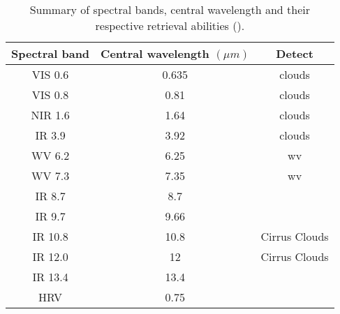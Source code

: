 \begin{table}[]
    \centering
    \setlength\extrarowheight{-7pt}
    \begin{tabular}{c|c|c}
        Spectral band & Central wavelength $\left( \mu m  \right)$ & Detect \\ \hline
        VIS 0.6 & 0.635 & clouds \\
        VIS 0.8 & 0.81  & clouds \\
        NIR 1.6 & 1.64  & clouds \\
        IR 3.9 & 3.92  & clouds  \\
        WV 6.2 & 6.25 & \acrlong{wv} \\
        WV 7.3 & 7.35 & \acrlong{wv} \\ 
        IR 8.7 & 8.7 & \\
        IR 9.7 & 9.66 & \\
        IR 10.8 & 10.8 & Cirrus Clouds \\
        IR 12.0 & 12 & Cirrus Clouds\\
        IR 13.4 & 13.4 & \\
        HRV & 0.75 & 
    \end{tabular}
    \caption{Summary of spectral bands, central wavelength and their respective retrieval abilities (\cite{Schmetz_meteosat_intro}).}
    \label{tab:msg_spectral_bands}
\end{table}